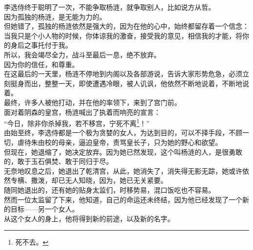 \begin{multicols}{\theparacolNo}
李选侍终于聪明了一次，不能争取杨涟，就争取别人，比如说方从哲。\\

因为孤独的杨涟，是无能为力的。\\

但她错了，孤独的杨涟依然是强大的，因为在他的心中，始终都留存着一个信念：\\

当我只是个小人物的时候，你体谅我的激奋，接受我的意见，相信我的才能，将你的身后之事托付于我。\\

所以，我会竭尽全力，战斗至最后一息，绝不放弃。\\

因为你的信任，和尊重。\\

在这最后的一天里，杨涟不停地到内阁以及各部游说，告诉大家形势危急，必须立刻挺身而出，整整一天，即使遭遇冷眼，被人讥讽，他依然不断地说着，不断地说着。\\

最终，许多人被他打动，并在他的率领下，来到了宫门前。\\

面对着阴森的皇宫，杨涟喊出了执着而响亮的宣言：\\

“今日，除非你杀掉我，若不移宫，宁死不离\footnote{死不去。}！”\\

由始至终，李选侍都是一个极为贪婪的女人，为达到目的，可以不择手段，不顾一切，虐待朱由校的母亲，逼迫皇帝，责骂皇长子，只为她的野心和欲望。\\

但现在，她退缩了，她决定放弃。因为她已然发现，这个叫杨涟的人，是很勇敢的，敢于玉石俱焚、敢于同归于尽。\\

无奈地叹息之后，她退出了乾清宫，从此，她消失了，消失得无影无踪，她或许依然专横、撒泼，却已无人知晓，因为，她已无关紧要。\\

随同她退出的，还有她的贴身太监们，时移势易，混口饭吃也不容易。\\

然而一位太监留了下来，他知道，自己的命运还未终结，因为他已经发现了一个新的目标——另一个女人。\\

从这个女人的身上，他将得到新的前途，以及新的名字。\\
\ifnum{}
	\end{multicols}
\fi
\newpage

